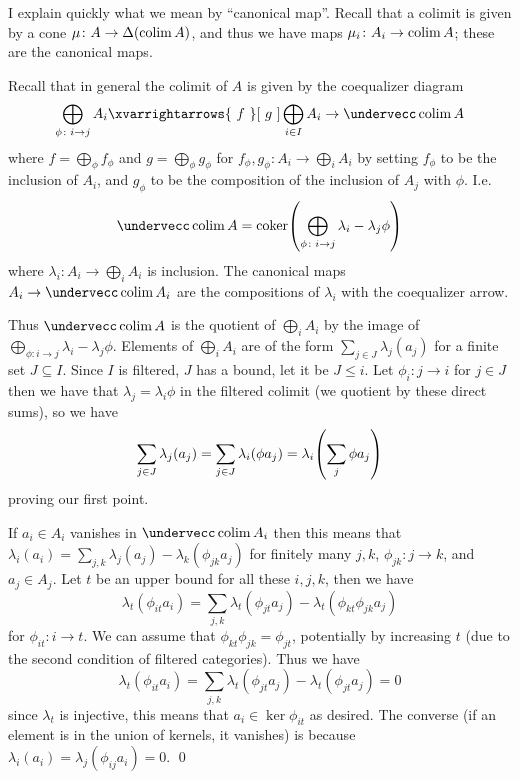 \elemm

I explain quickly what we mean by ``canonical map''.
Recall that a colimit is given by a cone $\mu\colon A\to\Delta(\mathop{\rm colim}\nolimits A)$, and thus we have maps $\mu_i\colon A_i\to\mathop{\rm colim}\nolimits A$; these are the canonical maps.

\bproof

    Recall that in general the colimit of $A$ is given by the coequalizer diagram
    $$ \bigoplus_{\phi\colon i\to j}A_i \xvarrightarrows{\ f\ }[\ g\ ]\bigoplus_{i\in I}A_i \to \coflim A $$
    where $f=\bigoplus_\phi f_\phi$ and $g=\bigoplus_\phi g_\phi$ for $f_\phi,g_\phi\colon A_i\to\bigoplus_iA_i$ by setting $f_\phi$ to be the inclusion of $A_i$,
    and $g_\phi$ to be the composition of the inclusion of $A_j$ with $\phi$.
    I.e.\ %
    $$ \coflim A = \coker\parens{\bigoplus_{\phi\colon i\to j}\lambda_i-\lambda_j\phi} $$
    where $\lambda_i\colon A_i\to\bigoplus_iA_i$ is inclusion.
    The canonical maps $A_i\to\coflim A_i$ are the compositions of $\lambda_i$ with the coequalizer arrow.

    Thus $\coflim A$ is the quotient of $\bigoplus_iA_i$ by the image of $\bigoplus_{\phi\colon i\to j}\lambda_i-\lambda_j\phi$.
    Elements of $\bigoplus_iA_i$ are of the form $\sum_{j\in J}\lambda_j(a_j)$ for a finite set $J\subseteq I$.
    Since $I$ is filtered, $J$ has a bound, let it be $J\leq i$.
    Let $\phi_i\colon j\to i$ for $j\in J$ then we have that $\lambda_j=\lambda_i\phi$ in the filtered colimit (we quotient by these direct sums), so we have
    $$ \sum_{j\in J}\lambda_j(a_j) = \sum_{j\in J}\lambda_i(\phi a_j) = \lambda_i\mathopen{}\mathclose{\left(\sum_j\phi a_j\right)} $$
    proving our first point.

    If $a_i\in A_i$ vanishes in $\coflim A_i$ then this means that $\lambda_i(a_i)=\sum_{j,k}\lambda_j(a_j)-\lambda_k(\phi_{jk}a_j)$ for finitely many $j,k$,
    $\phi_{jk}\colon j\to k$, and $a_j\in A_j$.
    Let $t$ be an upper bound for all these $i,j,k$, then we have
    $$ \lambda_t(\phi_{it}a_i) = \sum_{j,k}\lambda_t(\phi_{jt}a_j) - \lambda_t(\phi_{kt}\phi_{jk}a_j) $$
    for $\phi_{it}\colon i\to t$.
    We can assume that $\phi_{kt}\phi_{jk}=\phi_{jt}$, potentially by increasing $t$ (due to the second condition of filtered categories).
    Thus we have
    $$ \lambda_t(\phi_{it}a_i) = \sum_{j,k}\lambda_t(\phi_{jt}a_j)-\lambda_t(\phi_{jt}a_j) = 0 $$
    since $\lambda_t$ is injective, this means that $a_i\in\ker\phi_{it}$ as desired.
    The converse (if an element is in the union of kernels, it vanishes) is because $\lambda_i(a_i)=\lambda_j(\phi_{ij}a_i)=0$.
    \qed

